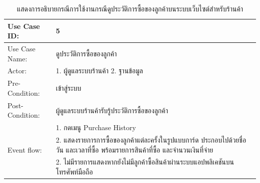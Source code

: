 \begin{table}[htbp]
  \centering
  \caption{แสดงการอธิบายกรณีการใช้งานกรณีดูประวัติการซื้อของลูกค้าบนระบบเว็บไซต์สำหรับร้านค้า}
  \label{tab:example}
  \begin{tabularx}{\textwidth}{|p{3cm}|X|}
      \hline
      \multirow{1}{3cm}{Use Case ID:} & 5 \\
      \hline
      \multirow{1}{3cm}{Use Case Name:} & ดูประวัติการซื้อของลูกค้า \\
      \hline
      \multirow{1}{3cm}{Actor:} & 1. ผู้ดูแลระบบร้านค้า  2. ฐานข้อมูล \\
      \hline
      \multirow{1}{3cm}{Pre-Condition:} & เข้าสู่ระบบ \\
      \hline
      \multirow{1}{3cm}{Post-Condition:} & ผู้ดูแลระบบร้านค้ารับรู้ประวัติการซื้อของลูกค้า \\
      \hline
      \multirow{3}{3cm}{Event flow:} & 1. กดเมนู Purchase History  \\ 
      & 2. แสดงรายการการซื้อของลูกค้าแต่ละครั้งในรูปแบบการ์ด ประกอบไปด้วยชื่อ วัน และเวลาที่ซื้อ พร้อมรายการสินค้าที่ซื้อ และจำนวนเงินที่จ่าย \\
      \hline
      \multirow{1}{3cm}{Alternative flow:} & 2. ไม่มีรายการแสดงหากยังไม่มีลูกค้าซื้อสินค้าผ่านระบบแอปพลิเคชันบนโทรศัพท์มือถือ \\
      \hline
  \end{tabularx}
\end{table}

